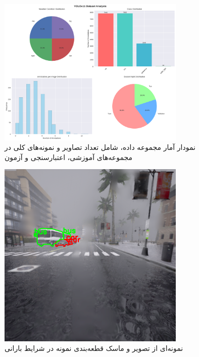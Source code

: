 \documentclass[oneside]{report}
\begin{document}
\begin{figure}[H]
  \centering
  \includegraphics[width=0.8\textwidth]{images/data2/dataset_statistics.png}
  \caption{نمودار آمار مجموعه داده، شامل تعداد تصاویر و نمونه‌های کلی در مجموعه‌های آموزشی، اعتبارسنجی و آزمون}
\end{figure}
\begin{figure}[H]
  \centering
  \includegraphics[width=0.8\textwidth]{images/data2/sample_10_rain_000079.png}
  \caption{نمونه‌ای از تصویر و ماسک قطعه‌بندی نمونه در شرایط بارانی}
\end{figure}
\end{document}

